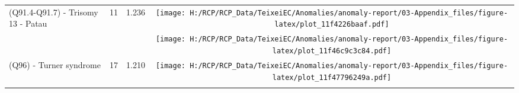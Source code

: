 \documentclass[
]{krantz}
\begin{document}
\begin{longtable}[t]{>{\raggedright\arraybackslash}m{4cm}cc>{}c}
(Q91.4-Q91.7) - Trisomy 13 - Patau & 11 & 1.236 & \texttt{[image: H:/RCP/RCP\_Data/TeixeiEC/Anomalies/anomaly-report/03-Appendix\_files/figure-latex/plot\_11f4226baaf.pdf]}\\
\addlinespace
\cellcolor{gray!6}{(Q91.0-Q91.3) - Trisomy 18 - Edwards} & \cellcolor{gray!6}{24} & \cellcolor{gray!6}{1.230} & \cellcolor{gray!6}{}\texttt{[image: H:/RCP/RCP\_Data/TeixeiEC/Anomalies/anomaly-report/03-Appendix\_files/figure-latex/plot\_11f46c9c3c84.pdf]}\\
(Q96) - Turner syndrome & 17 & 1.210 & \texttt{[image: H:/RCP/RCP\_Data/TeixeiEC/Anomalies/anomaly-report/03-Appendix\_files/figure-latex/plot\_11f47796249a.pdf]}\\*
\end{longtable}
\endgroup{}
\end{document}
